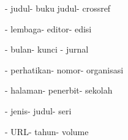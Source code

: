 \begin{itemize}
\begin{itemize}
\hspace*{0.5in}- judul\hspace*{0.5in}\hspace*{0.5in}- buku judul\hspace*{0.5in}\hspace*{0.5in}- crossref\par

\hspace*{0.5in}- lembaga\hspace*{0.5in}\hspace*{0.5in}- editor\hspace*{0.5in}\hspace*{0.5in}- edisi\par

\hspace*{0.5in}- bulan\hspace*{0.5in}\hspace*{0.5in}- kunci \hspace*{0.5in}\hspace*{0.5in}- jurnal\par

\hspace*{0.5in}- perhatikan\hspace*{0.5in}\hspace*{0.5in}- nomor\hspace*{0.5in}\hspace*{0.5in}- organisasi\par

\hspace*{0.5in}- halaman\hspace*{0.5in}\hspace*{0.5in}- penerbit\hspace*{0.5in}\hspace*{0.5in}- sekolah\par

\hspace*{0.5in}- jenis\hspace*{0.5in}\hspace*{0.5in}- judul\hspace*{0.5in}\hspace*{0.5in}- seri\par

\hspace*{0.5in}- URL\hspace*{0.5in}\hspace*{0.5in}- tahun\hspace*{0.5in}\hspace*{0.5in}- volume\par


\end{itemize}
\end{itemize}

